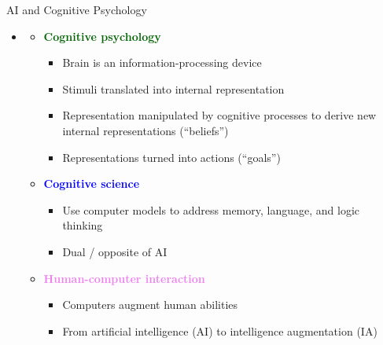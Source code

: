 \documentclass[
  10pt,
  ignorenonframetext,
]{beamer}
\providecommand{\tightlist}{%
  \setlength{\itemsep}{0pt}\setlength{\parskip}{0pt}}
\begin{document}
\begin{frame}{AI and Cognitive Psychology}
\label{ai-and-cognitive-psychology}
\begin{itemize}
\tightlist
\item
  \textbf{\textcolor{red}{\textcolor{black}{}}}

  \begin{itemize}
  \tightlist
  \item
    \textbf{\textcolor{darkgreen}{Cognitive psychology}}

    \begin{itemize}
    \tightlist
    \item
      Brain is an information-processing device
    \item
      Stimuli translated into internal representation
    \item
      Representation manipulated by cognitive processes to derive new
      internal representations (``beliefs'')
    \item
      Representations turned into actions (``goals'')
    \end{itemize}
  \item
    \textbf{\textcolor{blue}{Cognitive science}}

    \begin{itemize}
    \tightlist
    \item
      Use computer models to address memory, language, and logic
      thinking
    \item
      Dual / opposite of AI
    \end{itemize}
  \item
    \textbf{\textcolor{violet}{Human-computer interaction}}

    \begin{itemize}
    \tightlist
    \item
      Computers augment human abilities
    \item
      From artificial intelligence (AI) to intelligence augmentation
      (IA)
    \end{itemize}
  \end{itemize}
\end{itemize}
\end{frame}
\end{document}
